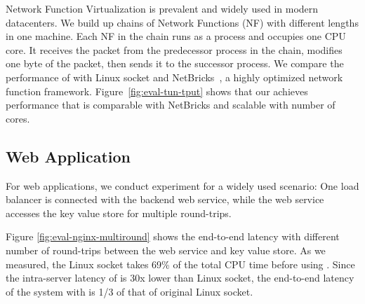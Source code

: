 Network Function Virtualization is prevalent and widely used in modern datacenters. We build up chains of Network Functions (NF) with different lengths in one machine. Each NF in the chain runs as a process and occupies one CPU core. It receives the packet from the predecessor process in the chain, modifies one byte of the packet, then sends it to the successor process. We compare the performance of \sys{} with Linux socket and NetBricks~\cite{panda2016netbricks}, a highly optimized network function framework. Figure~\ref{fig:eval-tun-tput} shows that our \sys achieves performance that is comparable with NetBricks and scalable with number of cores.



\subsection{Web Application}
For web applications, we conduct experiment for a widely used scenario: One load balancer is connected with the backend web service, while the web service accesses the key value store for multiple round-trips.

Figure \ref{fig:eval-nginx-multiround} shows the end-to-end latency with different number of round-trips between the web service and key value store. As we measured, the Linux socket takes 69\% of the total CPU time before using \libipc. Since the intra-server latency of \sys{} is 30x lower than Linux socket, the end-to-end latency of the system with \sys{}  is 1/3 of that of original Linux socket.













